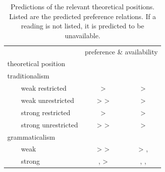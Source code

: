 \documentclass[fleqn,reqno,10pt]{article}
\newcommand{\lit}{\acro{lit}}
\newcommand{\glb}{\acro{glb}}
\newcommand{\loc}{\acro{loc}}
\newcommand{\as}{\acro{as}}
\renewcommand{\es}{\acro{es}}
\begin{document}
\begin{table}[t]
  \centering
  \begin{tabular}{lcc}
    & \multicolumn{2}{c}{preference \& availability}
    \\ \cmidrule(r){2-3}
    theoretical position
    & \as
    & \es
    \\ \midrule
    traditionalism
    \\
    \ \ \ \ weak restricted 
    & \lit > \glb 
    & \lit > \glb
    \\
    \ \ \ \ weak unrestricted
    & \lit > \glb > \loc 
    & \lit > \glb
    \\
    \ \ \ \ strong restricted
    & \glb > \lit 
    & \glb > \lit
    \\
    \ \ \ \ strong unrestricted
    & \glb > \loc > \lit 
    & \glb > \lit
    \\
    grammaticalism
    \\
    \ \ \ \ weak
    & \loc > \glb > \lit 
    & \glb > \lit, \loc
    \\
    \ \ \ \ strong
    & \glb, \loc > \lit 
    & \glb, \loc , \lit
    \\
  \end{tabular}
  \caption{Predictions of the relevant theoretical positions. Listed
    are the predicted preference relations. If a reading is not
    listed, it is predicted to be unavailable.}
  \label{tab:predictions}
\end{table}
\end{document}
